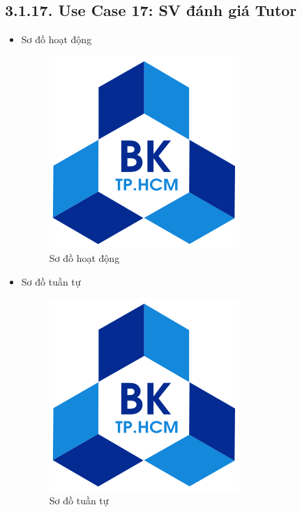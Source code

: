 \subsection*{3.1.17. Use Case 17: SV đánh giá Tutor}
\begin{itemize}
    \item Sơ đồ hoạt động
    \begin{figure}[H]
    \centering
    \includegraphics[scale=0.5 ]{Picture/hcmut.png}
    \caption{Sơ đồ hoạt động }
    \end{figure}
    \item Sơ đồ tuần tự
    \begin{figure}[H]
    \centering
    \includegraphics[scale=0.5 ]{Picture/hcmut.png}
    \caption{Sơ đồ tuần tự }
    \end{figure}
\end{itemize}
